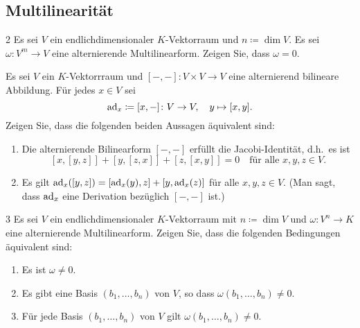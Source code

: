 \subsection{Multilinearität}












\begin{question}[subtitle = Das Verschwinden von alternierenden Formen für große Dimensionen]{2}
  Es sei $V$ ein endlichdimensionaler $K$-Vektorraum und $n \coloneqq \dim V$.
  Es sei $\omega \colon V^m \to V$ eine alternierende Multilinearform.
  Zeigen Sie, dass $\omega = 0$.
\end{question}







\begin{question}[subtitle = Charakterisierungen der Jacobi-Identität]{3}
  Es sei $V$ ein $K$-Vektorrraum und $[-,-] \colon V \times V \to V$ eine alternierend bilineare Abbildung.
  Für jedes $x \in V$ sei
  \[
    \operatorname{ad}_x \coloneqq [x,-] \colon V \to V, \quad y \mapsto [x,y].
  \]
  Zeigen Sie, dass die folgenden beiden Aussagen äquivalent sind:
  \begin{enumerate}
    \item
      Die alternierende Bilinearform $[-,-]$ erfüllt die Jacobi-Identität, d.h.\ es ist
      \[
        [x,[y,z]] + [y,[z,x]] + [z,[x,y]] = 0
        \quad
        \text{für alle $x, y, z \in V$}.
      \]
    \item
      Es gilt $\operatorname{ad}_x([y,z]) = [\operatorname{ad}_x(y), z] + [y, \operatorname{ad}_x(z)]$ für alle $x, y, z \in V$.
      (Man sagt, dass $\operatorname{ad}_x$ eine Derivation bezüglich $[-,-]$ ist.)
  \end{enumerate}
\end{question}


\begin{question}[subtitle = Charakterisierungen nicht verschwindender alternierender Formen]{3}
  Es sei $V$ ein endlichdimensionaler $K$-Vektorraum mit $n \coloneqq \dim V$ und $\omega \colon V^n \to K$ eine alternierende Multilinearform.
  Zeigen Sie, dass die folgenden Bedingungen äquivalent sind:
  \begin{enumerate}
    \item
      Es ist $\omega \neq 0$.
    \item
      Es gibt eine Basis $(b_1, \dotsc, b_n)$ von $V$, so dass $\omega(b_1, \dotsc, b_n) \neq 0$.
    \item
      Für jede Basis $(b_1, \dotsc, b_n)$ von $V$ gilt $\omega(b_1, \dotsc, b_n) \neq 0$.
  \end{enumerate}
\end{question}





